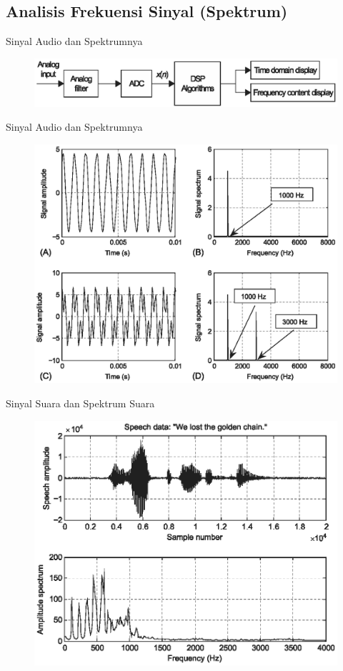 \documentclass[pdflatex,compress,mathserif]{beamer}
\begin{document}
\subsection{Analisis Frekuensi Sinyal (Spektrum)}

\begin{frame}{Sinyal Audio dan Spektrumnya}
	\begin{figure}
		\includegraphics[width=\linewidth]{img/img04}
	\end{figure}
\end{frame}

\begin{frame}{Sinyal Audio dan Spektrumnya}
	\begin{figure}
		\includegraphics[width=0.8\linewidth]{img/img05}
	\end{figure}
\end{frame}

\begin{frame}{Sinyal Suara dan Spektrum Suara}
	\begin{figure}
		\includegraphics[width=0.8\linewidth]{img/img06}
	\end{figure}
\end{frame}
\end{document}
